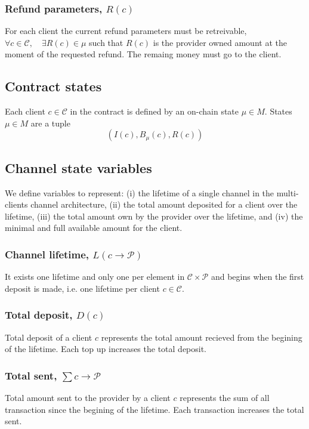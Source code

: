 \documentclass{llncs}
\begin{document}
\subsubsection{Refund parameters, $R(c)$} For each client the current refund parameters must be retreivable, $\forall c \in \mathcal{C}, \quad \exists R(c) \in \mu$ such that $R(c)$ is the provider owned amount at the moment of the requested refund. The remaing money must go to the client.

\subsection{Contract states} Each client $c \in \mathcal{C}$ in the contract is defined by an on-chain state $\mu \in M$. States $\mu \in M$ are a tuple
$$(I(c), B_\mu(c), R(c))$$

\subsection{Channel state variables} We define variables to represent: (i) the lifetime of a single channel in the multi-clients channel architecture, (ii) the total amount deposited for a client over the lifetime, (iii) the total amount own by the provider over the lifetime, and (iv) the minimal and full available amount for the client.

\subsubsection{Channel lifetime, $L(c \rightarrow \mathcal{P})$} It exists one lifetime and only one per element in $\mathcal{C} \times \mathcal{P}$ and begins when the first deposit is made, i.e. one lifetime per client $c \in \mathcal{C}$.

\subsubsection{Total deposit, $D(c)$} Total deposit of a client $c$ represents the total amount recieved from the begining of the lifetime. Each top up increases the total deposit.

\subsubsection{Total sent, $\sum c \rightarrow \mathcal{P}$} Total amount sent to the provider by a client $c$ represents the sum of all transaction since the begining of the lifetime. Each transaction increases the total sent.
\end{document}
